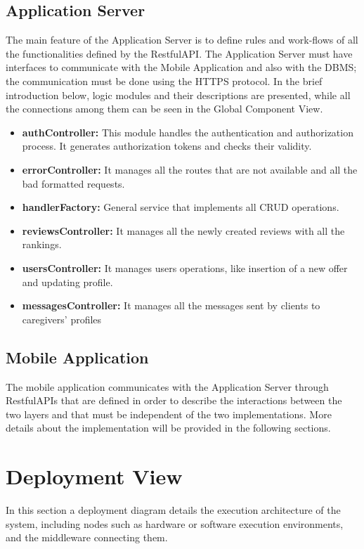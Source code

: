 \documentclass[../../dd.tex]{subfiles}
\begin{document}
    \subsection{Application Server}
    The main feature of the Application Server is to define rules and work-flows
    of all the functionalities defined by the RestfulAPI.
    The Application Server must have interfaces to communicate with the Mobile
    Application and also with the DBMS; the communication must be done using
    the HTTPS protocol.
    In the brief introduction below, logic modules and their descriptions are
    presented, while all the connections among them can be seen in the Global
    Component View.
    \begin{itemize}
        \item \textbf{authController:} This module handles the authentication and authorization process.
        It generates authorization tokens and checks their validity.
        \item \textbf{errorController:} It manages all the routes that are not available and all the bad formatted requests.
        \item \textbf{handlerFactory:} General service that implements all CRUD operations.
        \item \textbf{reviewsController:} It manages all the newly created reviews with all the rankings.
        \item \textbf{usersController:} It manages users operations, like insertion of a new offer and updating
        profile.
        \item \textbf{messagesController:} It manages all the messages sent by clients to caregivers' profiles
    \end{itemize}

    \subsection{Mobile Application}
    The mobile application communicates with the Application Server
    through RestfulAPIs that are defined in order to describe the interactions
    between the two layers and that must be independent of the two implementations. More details about the implementation will be provided in the following sections.

    \newpage
    \section{Deployment View}
    In this section a deployment diagram details the execution architecture of the system, including nodes such as hardware or software execution environments, and the middleware connecting them.
\end{document}
